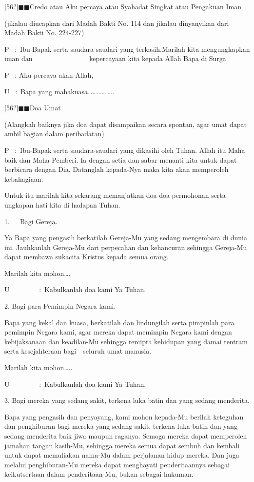 \documentclass{article}
\begin{document}
[56?]${\blacksquare}{\blacksquare}$Credo atau Aku percaya atau Syahadat Singkat atau Pengakuan Iman

(jikalau diucapkan dari Madah Bakti No. 114 dan jikalau dinyanyikan dari Madah Bakti No. 224-227)

P~ :~Ibu-Bapak serta saudara-saudari yang terkasih.Marilah kita mengungkapkan iman dan ~ ~ ~ ~ ~ ~ ~ ~ ~ ~kepercayaan
kita kepada Allah Bapa di Surga

P~ : Aku percaya akan Allah,

U~ :~Bapa yang mahakuasa{\dots}{\dots}{\dots}{\dots}{\dots}..

[56?]${\blacksquare}{\blacksquare}$Doa Umat

(Alangkah baiknya jika doa dapat disampaikan secara spontan, agar umat dapat ambil bagian dalam peribadatan)

P~ :~Ibu-Bapak serta saudara-saudari yang dikasihi oleh Tuhan. Allah itu Maha baik dan Maha Pemberi. Ia dengan setia dan
sabar menanti kita untuk dapat berbicara dengan Dia. Datanglah kepada-Nya maka kita akan memperoleh kebahagiaan.

Untuk itu marilah kita sekarang memanjatkan doa-doa permohonan serta ungkapan hati kita di hadapan Tuhan.

1.~~~Bagi Gereja.

Ya Bapa yang pengasih berkatilah Gereja-Mu yang sedang mengembara di dunia ini. Jauhkanlah Gereja-Mu dari perpecahan dan
kehancuran sehingga Gereja-Mu dapat membawa sukacita Kristus kepada semua orang.

Marilah kita mohon{\dots}.

U~~~~~~~~ :~Kabulkanlah doa kami Ya Tuhan.

2. Bagi para Pemimpin Negara kami.

Bapa yang kekal dan kuasa, berkatilah dan lindungilah serta pimpinlah para pemimpin Negara kami, agar mereka dapat
memimpin Negara kami dengan kebijaksanaan dan keadilan-Mu sehingga tercipta kehidupan yang damai tentram serta
kesejahteraan bagi~~seluruh umat manusia.

Marilah kita mohon{\dots}..

U~~~~~~~~ :~Kabulkanlah doa kami Ya Tuhan.

3. Bagi mereka yang sedang sakit, terkena luka batin dan yang sedang menderita.

Bapa yang pengasih dan penyayang, kami mohon kepada-Mu berilah keteguhan dan penghiburan bagi mereka yang sedang sakit,
terkena luka batin dan yang sedang menderita baik jiwa maupun raganya. Semoga mereka dapat memperoleh jamahan tangan
kasih-Mu, sehingga mereka semua dapat sembuh dan kembali untuk dapat memuliakan nama-Mu dalam perjalanan hidup mereka.
Dan juga melalui penghiburan-Mu mereka dapat menghayati penderitaannya sebagai keikutsertaan dalam penderitaan-Mu,
bukan sebagai hukuman.
\end{document}

